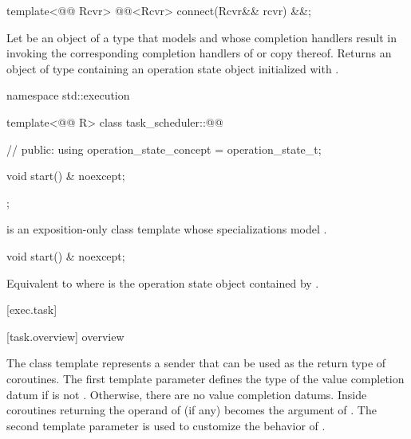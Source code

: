 %
\begin{itemdecl}
template<@@ Rcvr>
  @@<Rcvr> connect(Rcvr&& rcvr) &&;
\end{itemdecl}
\begin{itemdescr}
\pnum
\effects
Let  be an object of a type that models 
and whose completion handlers result in invoking the corresponding
completion handlers of  or copy thereof.
Returns an object of type  containing
an operation state object initialized with .
\end{itemdescr}

\pnum
\begin{codeblock}
namespace std::execution {
  template<@@ R>
  class task_scheduler::@@ {         // \expos
  public:
    using operation_state_concept = operation_state_t;

    void start() & noexcept;
  };
}
\end{codeblock}
 is an exposition-only class template whose
specializations model .

%
\begin{itemdecl}
void start() & noexcept;
\end{itemdecl}
\begin{itemdescr}
\pnum
\effects
Equivalent to  where  is the operation
state object contained by .
\end{itemdescr}

[exec.task]{}

[task.overview]{ overview}

\pnum
The  class template represents a sender that can
be used as the return type of coroutines.
The first template parameter  defines the type of the value
completion datum if  is not .
Otherwise, there are no value completion datums.
Inside coroutines returning  the operand of
 (if any) becomes the argument of .
The second template parameter  is used to customize
the behavior of .

